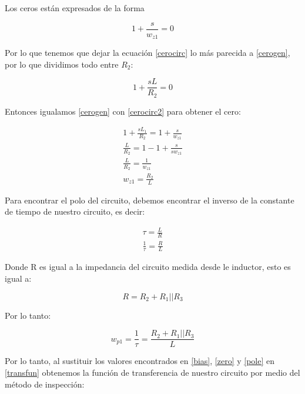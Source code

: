 \documentclass{article}
\begin{document}
	Los ceros están expresados de la forma
	
	\begin{equation}
	1+\frac{s}{w_{z1}}=0
	\label{cerogen}
	\end{equation}
	
	Por lo que tenemos que dejar la ecuación \eqref{cerocirc} lo más parecida a \eqref{cerogen}, por lo que dividimos todo entre $ R_2 $:
	
	\begin{equation}
	1+\frac{sL}{R_2}=0
	\label{cerocirc2}
	\end{equation}
	
	Entonces igualamos \eqref{cerogen} con \eqref{cerocirc2} para obtener el cero:
	
	\begin{equation}
	\begin{split}
	1+\frac{sL_1}{R_2}=	1+\frac{s}{w_{z1}}\\
	\frac{L}{R_2}=1-1+\frac{s}{sw_{z1}}\\
	\frac{L}{R_2}=\frac{1}{w_{z1}}\\
	w_{z1}=\frac{R_2}{L} \label{zero}
	\end{split}
	\end{equation}
	
	Para encontrar el polo del circuito, debemos encontrar el inverso de la constante de tiempo de nuestro circuito, es decir:
	
	\begin{equation}
	\begin{split}
	\tau=\frac{L}{R}\\
	\frac{1}{\tau}=\frac{R}{L}
	\end{split}
	\end{equation}
	
	Donde R es igual a la impedancia del circuito medida desde le inductor, esto es igual a:
	
	\begin{equation}
	R=R_2+R_1||R_3
	\end{equation}
	
	Por lo tanto:
	
	\begin{equation}
	w_{p1}=\frac{1}{\tau}=\frac{R_2+R_1||R_3}{L}
	\label{pole}
	\end{equation}
	
	Por lo tanto, al sustituir los valores encontrados en \eqref{bias}, \eqref{zero} y \eqref{pole} en \eqref{transfun} obtenemos la función de transferencia de nuestro circuito por medio del método de inspección:
	
\end{document}
